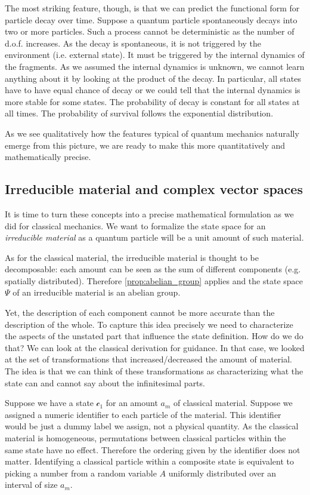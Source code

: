\documentclass[smallextended]{svjour3}
\numberwithin{equation}{section}
\theoremstyle{definition}
\begin{document}
The most striking feature, though, is that we can predict the functional form for particle decay over time. Suppose a quantum particle spontaneously decays into two or more particles. Such a process cannot be deterministic as the number of d.o.f. increases. As the decay is spontaneous, it is not triggered by the environment (i.e. external state). It must be triggered by the internal dynamics of the fragments. As we assumed the internal dynamics is unknown, we cannot learn anything about it by looking at the product of the decay. In particular, all states have to have equal chance of decay or we could tell that the internal dynamics is more stable for some states. The probability of decay is constant for all states at all times. The probability of survival follows the exponential distribution.

As we see qualitatively how the features typical of quantum mechanics naturally emerge from this picture, we are ready to make this more quantitatively and mathematically precise.

\subsection{Irreducible material and complex vector spaces}

It is time to turn these concepts into a precise mathematical formulation as we did for classical mechanics. We want to formalize the state space for an \emph{irreducible material} as a quantum particle will be a unit amount of such material.

As for the classical material, the irreducible material is thought to be decomposable: each amount can be seen as the sum of different components (e.g. spatially distributed). Therefore \ref{prop:abelian_group} applies and the state space $\Psi$ of an irreducible material is an abelian group.

Yet, the description of each component cannot be more accurate than the description of the whole. To capture this idea precisely we need to characterize the aspects of the unstated part that influence the state definition. How do we do that? We can look at the classical derivation for guidance. In that case, we looked at the set of transformations that increased/decreased the amount of material. The idea is that we can think of these transformations as characterizing what the state can and cannot say about the infinitesimal parts.

Suppose we have a state $\mathcal{c}_1$ for an amount $a_m$ of classical material. Suppose we assigned a numeric identifier to each particle of the material. This identifier would be just a dummy label we assign, not a physical quantity. As the classical material is homogeneous, permutations between classical particles within the same state have no effect. Therefore the ordering given by the identifier does not matter. Identifying a classical particle within a composite state is equivalent to picking a number from a random variable $A$ uniformly distributed over an interval of size $a_m$.
\end{document}
